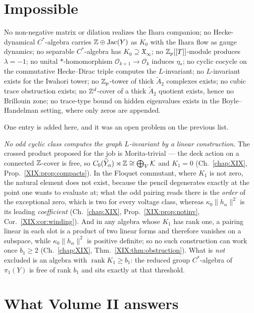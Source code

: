 \section{Impossible}

No non-negative matrix or dilation realizes the Ihara companion; no Hecke-dynamical
$C^*$-algebra carries $\mathbb{Z}\oplus\operatorname{Jac}(Y)$ as $K_0$ with the Ihara flow as gauge dynamics;
no separable $C^*$-algebra has $K_0\supseteq\mathfrak X_\infty$; no $\mathbb{Z}_p[[T]]$-module
produces $\lambda=-1$; no unital $*$-homomorphism $\mathcal O_{k+1}\to\mathcal O_k$
induces $\eta_*$; no cyclic cocycle on the commutative Hecke--Dirac triple computes the
$L$-invariant; no $L$-invariant exists for the Iwahori tower; no $\mathbb{Z}_p$-tower of thick
$\widetilde A_2$ complexes exists; no cubic trace obstruction exists; no $\mathbb{Z}^d$-cover of a
thick $\widetilde A_2$ quotient exists, hence no Brillouin zone; no trace-type bound on
hidden eigenvalues exists in the Boyle--Handelman setting, where only zeros are appended.

One entry is added here, and it was an open problem on the previous list.

\emph{No odd cyclic class computes the graph $L$-invariant by a linear construction.}
The crossed product proposed for the job is Morita-trivial --- the deck action on a
connected $\mathbb{Z}$-cover is free, so $C_0(\widetilde Y_\alpha)\rtimes\mathbb{Z}\cong\bigoplus_V\mathcal
K$ and $K_1=0$ (Ch.~\ref{chap:XIX}, Prop.~\ref{XIX:prop:compacts}). In the Floquet
commutant, where $K_1$ is not zero, the natural element does not exist, because the pencil
degenerates exactly at the point one wants to evaluate at; what the odd pairing reads there
is the \emph{order} of the exceptional zero, which is two for every voltage class, whereas
$\kappa_0\|h_\alpha\|^2$ is its leading \emph{coefficient}
(Ch.~\ref{chap:XIX}, Prop.~\ref{XIX:prop:notinv}, Cor.~\ref{XIX:cor:winding}). And in any
algebra whose $K_1$ has rank one, a pairing linear in each slot is a product of two linear
forms and therefore vanishes on a subspace, while $\kappa_0\|h_\alpha\|^2$ is positive
definite; so no such construction can work once $b_1\ge2$
(Ch.~\ref{chap:XIX}, Thm.~\ref{XIX:thm:obstruction}). What is \emph{not} excluded is an
algebra with $\operatorname{rank}K_1\ge b_1$: the reduced group $C^*$-algebra of
$\pi_1(Y)$ is free of rank $b_1$ and sits exactly at that threshold.

\section{What Volume II answers}

